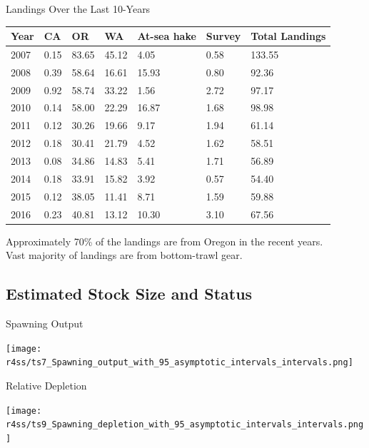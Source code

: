 \documentclass[pdf]{beamer}\usepackage[]{graphicx}\usepackage[]{color}
\begin{document}
\begin{frame}{Landings Over the Last 10-Years}
  \begin{table}[ht]
  \centering
  \begin{tabular}{p{0.4in}p{0.4in}p{0.4in}p{0.4in}p{0.4in}p{0.4in}p{0.6in}}
  Year & CA & OR & WA & At-sea hake & Survey & Total Landings \\ 
  \hline
  2007 & 0.15 & 83.65 & 45.12 & 4.05 & 0.58 & 133.55 \\ 
  2008 & 0.39 & 58.64 & 16.61 & 15.93 & 0.80 & 92.36 \\ 
  2009 & 0.92 & 58.74 & 33.22 & 1.56 & 2.72 & 97.17 \\ 
  2010 & 0.14 & 58.00 & 22.29 & 16.87 & 1.68 & 98.98 \\ 
  2011 & 0.12 & 30.26 & 19.66 & 9.17 & 1.94 & 61.14 \\ 
  2012 & 0.18 & 30.41 & 21.79 & 4.52 & 1.62 & 58.51 \\ 
  2013 & 0.08 & 34.86 & 14.83 & 5.41 & 1.71 & 56.89 \\ 
  2014 & 0.18 & 33.91 & 15.82 & 3.92 & 0.57 & 54.40 \\ 
  2015 & 0.12 & 38.05 & 11.41 & 8.71 & 1.59 & 59.88 \\ 
  2016 & 0.23 & 40.81 & 13.12 & 10.30 & 3.10 & 67.56 \\ 
  \hline
  \end{tabular}
  \end{table}
  Approximately 70\% of the landings are from Oregon in the recent years.\\
  Vast majority of landings are from bottom-trawl gear.
\end{frame}


\subsection{Estimated Stock Size and Status}
\begin{frame}{Spawning Output}
  \begin{center}
    \texttt{[image: r4ss/ts7\_Spawning\_output\_with\_95\_asymptotic\_intervals\_intervals.png]}
  \end{center}
\end{frame}


\begin{frame}{Relative Depletion}
  \begin{center}
    \texttt{[image: r4ss/ts9\_Spawning\_depletion\_with\_95\_asymptotic\_intervals\_intervals.png]}
  \end{center}
\end{frame}
\end{document}
